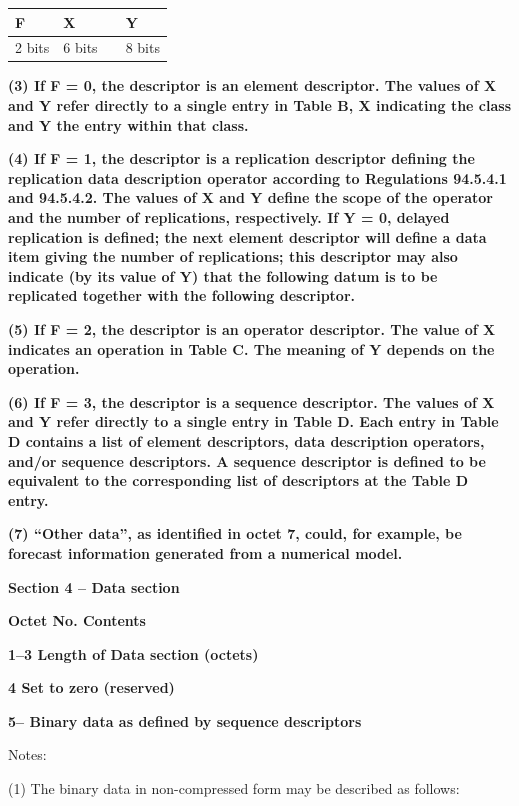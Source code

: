 \begin{longtable}[]{@{}llll@{}}
\toprule
F & X & & Y\tabularnewline
\midrule
\endhead
2 bits & 6 bits & & 8 bits\tabularnewline
\bottomrule
\end{longtable}

\textbf{(3) If F = 0, the descriptor is an element descriptor. The values of X and Y refer directly to a single entry in Table B, X indicating the class and Y the entry within that class.}

\textbf{(4) If F = 1, the descriptor is a replication descriptor defining the replication data description operator according to Regulations 94.5.4.1 and 94.5.4.2. The values of X and Y define the scope of the operator and the number of replications, respectively. If Y = 0, delayed replication is defined; the next element descriptor will define a data item giving the number of replications; this descriptor may also indicate (by its value of Y) that the following datum is to be replicated together with the following descriptor.}

\textbf{(5) If F = 2, the descriptor is an operator descriptor. The value of X indicates an operation in Table C. The meaning of Y depends on the operation.}

\textbf{(6) If F = 3, the descriptor is a sequence descriptor. The values of X and Y refer directly to a single entry in Table D. Each entry in Table D contains a list of element descriptors, data description operators, and/or sequence descriptors. A sequence descriptor is defined to be equivalent to the corresponding list of descriptors at the Table D entry.}

\textbf{(7) ``Other data'', as identified in octet 7, could, for example, be forecast information generated from a numerical model.}

\textbf{Section 4 -- Data section}

\textbf{Octet No. Contents}

\textbf{1--3 Length of Data section (octets)}

\textbf{4 Set to zero (reserved)}

\textbf{5-- Binary data as defined by sequence descriptors}

Notes:

(1) The binary data in non-compressed form may be described as follows:


